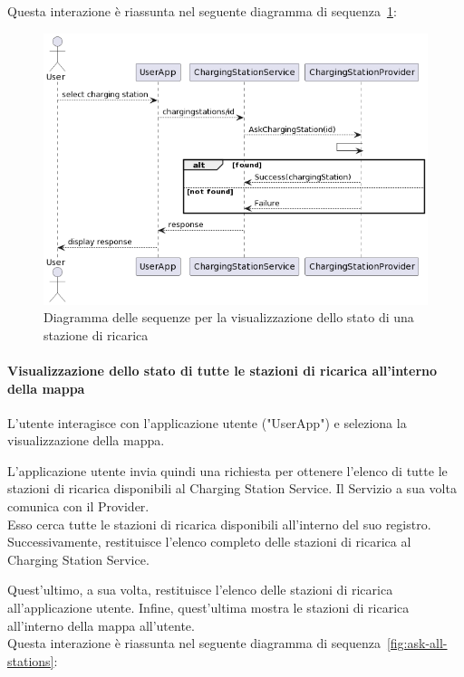 Questa interazione è riassunta nel seguente diagramma di sequenza \ref{fig:ask-station}:

\begin{figure}[htbp]
    \centering
    \includegraphics[width=\textwidth]{images/ask-station.png}
    \caption{Diagramma delle sequenze per la visualizzazione dello stato di una stazione di ricarica}
    \label{fig:ask-station}
\end{figure}

\paragraph{Visualizzazione dello stato di tutte le stazioni di ricarica all'interno della mappa}
L'utente interagisce con l'applicazione utente ("UserApp") e seleziona la visualizzazione della mappa.

L'applicazione utente invia quindi una richiesta per ottenere l'elenco di tutte le stazioni di
ricarica disponibili al Charging Station Service. Il Servizio a sua volta comunica con il Provider.\\

Esso cerca tutte le stazioni di ricarica disponibili all'interno del suo registro. Successivamente,
restituisce l'elenco completo delle stazioni di ricarica al Charging Station Service.

Quest'ultimo, a sua volta, restituisce l'elenco delle stazioni di ricarica all'applicazione
utente. Infine, quest'ultima mostra le stazioni di ricarica all'interno della mappa all'utente.\\

Questa interazione è riassunta nel seguente diagramma di sequenza \ref{fig:ask-all-stations}:

